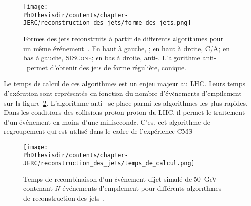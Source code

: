\begin{figure}[h]
\centering
\texttt{[image: \\PhDthesisdir/contents/chapter-JERC/reconstruction\_des\_jets/forme\_des\_jets.png]}
\caption[Formes des jets reconstruits à partir de différents algorithmes.]{Formes des jets reconstruits à partir de différents algorithmes pour un même événement~\cite{Cacciari_antikT}. En haut à gauche, \kT; en haut à droite, C/A; en bas à gauche, \textsc{SISCone}; en bas à droite, anti-\kT. L'algorithme anti-\kT\ permet d'obtenir des jets de forme régulière, conique.}
\label{fig-chapter-JERC-section-jets_reco-subsec-algo-examples}
\end{figure}
\par Le temps de calcul de ces algorithmes est un enjeu majeur au LHC.
Leurs temps d'exécution sont représentés en fonction du nombre d'événements d'empilement sur la figure~\ref{fig-chapter-JERC-section-jets_reco-subsec-algo-perfs}.
L'algorithme anti-\kT\ se place parmi les algorithmes les plus rapides.
Dans les conditions des collisions proton-proton du LHC, il permet le traitement d'un événement en moins d'une milliseconde.
C'est cet algorithme de regroupement qui est utilisé dans le cadre de l'expérience CMS.
\begin{figure}[h]
\centering
\texttt{[image: \\PhDthesisdir/contents/chapter-JERC/reconstruction\_des\_jets/temps\_de\_calcul.png]}
\caption[Temps de recombinaison d'un événement dijet.]{Temps de recombinaison d'un événement dijet simulé de \SI{50}{\GeV} contenant $N$ événements d'empilement pour différents algorithmes de reconstruction des jets~\cite{towards_jetography}.}
\label{fig-chapter-JERC-section-jets_reco-subsec-algo-perfs}
\end{figure}
